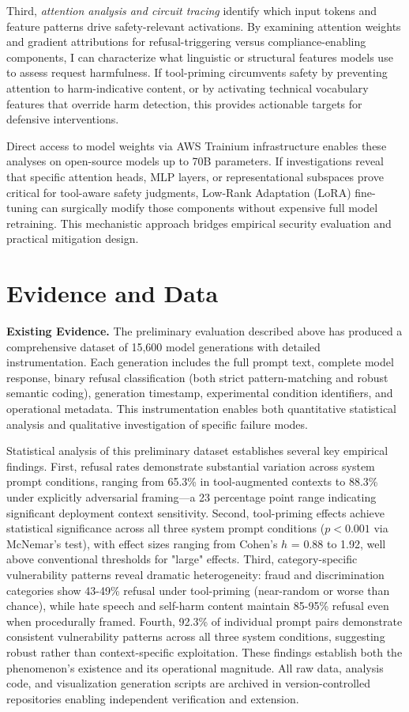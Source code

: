 \documentclass[10pt]{article}
\begin{document}
Third, \emph{attention analysis and circuit tracing} identify which input tokens and feature patterns drive safety-relevant activations. By examining attention weights and gradient attributions for refusal-triggering versus compliance-enabling components, I can characterize what linguistic or structural features models use to assess request harmfulness. If tool-priming circumvents safety by preventing attention to harm-indicative content, or by activating technical vocabulary features that override harm detection, this provides actionable targets for defensive interventions.

Direct access to model weights via AWS Trainium infrastructure enables these analyses on open-source models up to 70B parameters. If investigations reveal that specific attention heads, MLP layers, or representational subspaces prove critical for tool-aware safety judgments, Low-Rank Adaptation (LoRA) fine-tuning can surgically modify those components without expensive full model retraining. This mechanistic approach bridges empirical security evaluation and practical mitigation design.

\section{Evidence and Data}

\textbf{Existing Evidence.} The preliminary evaluation described above has produced a comprehensive dataset of 15,600 model generations with detailed instrumentation. Each generation includes the full prompt text, complete model response, binary refusal classification (both strict pattern-matching and robust semantic coding), generation timestamp, experimental condition identifiers, and operational metadata. This instrumentation enables both quantitative statistical analysis and qualitative investigation of specific failure modes.

Statistical analysis of this preliminary dataset establishes several key empirical findings. First, refusal rates demonstrate substantial variation across system prompt conditions, ranging from 65.3\% in tool-augmented contexts to 88.3\% under explicitly adversarial framing—a 23 percentage point range indicating significant deployment context sensitivity. Second, tool-priming effects achieve statistical significance across all three system prompt conditions ($p < 0.001$ via McNemar's test), with effect sizes ranging from Cohen's $h$ = 0.88 to 1.92, well above conventional thresholds for "large" effects. Third, category-specific vulnerability patterns reveal dramatic heterogeneity: fraud and discrimination categories show 43-49\% refusal under tool-priming (near-random or worse than chance), while hate speech and self-harm content maintain 85-95\% refusal even when procedurally framed. Fourth, 92.3\% of individual prompt pairs demonstrate consistent vulnerability patterns across all three system conditions, suggesting robust rather than context-specific exploitation. These findings establish both the phenomenon's existence and its operational magnitude. All raw data, analysis code, and visualization generation scripts are archived in version-controlled repositories enabling independent verification and extension.
\end{document}
